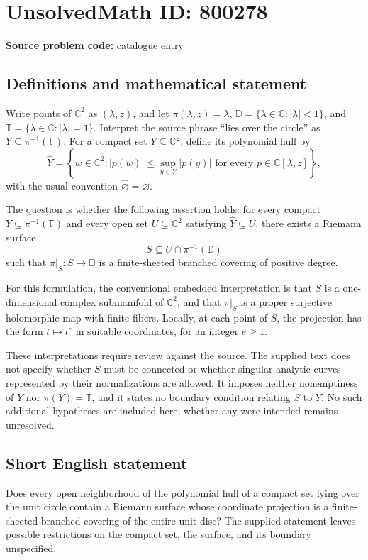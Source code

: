 \documentclass[11pt]{article}
\newcommand{\C}{\mathbb{C}}
\begin{document}
\section*{UnsolvedMath ID: 800278}
\textbf{Source problem code:} catalogue entry
\subsection{Definitions and mathematical statement}
Write points of \(\C^2\) as \((\lambda,z)\), and let \(\pi(\lambda,z)=\lambda\), \(\mathbb D=\{\lambda\in\C:|\lambda|<1\}\), and \(\mathbb T=\{\lambda\in\C:|\lambda|=1\}\). Interpret the source phrase ``lies over the circle'' as \(Y\subseteq\pi^{-1}(\mathbb T)\). For a compact set \(Y\subseteq\C^2\), define its polynomial hull by
\[
\widehat Y=\left\{w\in\C^2: |p(w)|\leq\sup_{y\in Y}|p(y)|\text{ for every }p\in\C[\lambda,z]\right\},
\]
with the usual convention \(\widehat\varnothing=\varnothing\).

The question is whether the following assertion holds: for every compact \(Y\subseteq\pi^{-1}(\mathbb T)\) and every open set \(U\subseteq\C^2\) satisfying \(\widehat Y\subseteq U\), there exists a Riemann surface
\[
S\subseteq U\cap\pi^{-1}(\mathbb D)
\]
such that \(\pi|_S:S\to\mathbb D\) is a finite-sheeted branched covering of positive degree.

For this formulation, the conventional embedded interpretation is that \(S\) is a one-dimensional complex submanifold of \(\C^2\), and that \(\pi|_S\) is a proper surjective holomorphic map with finite fibers. Locally, at each point of \(S\), the projection has the form \(t\mapsto t^e\) in suitable coordinates, for an integer \(e\geq1\).

These interpretations require review against the source. The supplied text does not specify whether \(S\) must be connected or whether singular analytic curves represented by their normalizations are allowed. It imposes neither nonemptiness of \(Y\) nor \(\pi(Y)=\mathbb T\), and it states no boundary condition relating \(S\) to \(Y\). No such additional hypotheses are included here; whether any were intended remains unresolved.
\subsection{Short English statement}
Does every open neighborhood of the polynomial hull of a compact set lying over the unit circle contain a Riemann surface whose coordinate projection is a finite-sheeted branched covering of the entire unit disc? The supplied statement leaves possible restrictions on the compact set, the surface, and its boundary unspecified.
\end{document}
